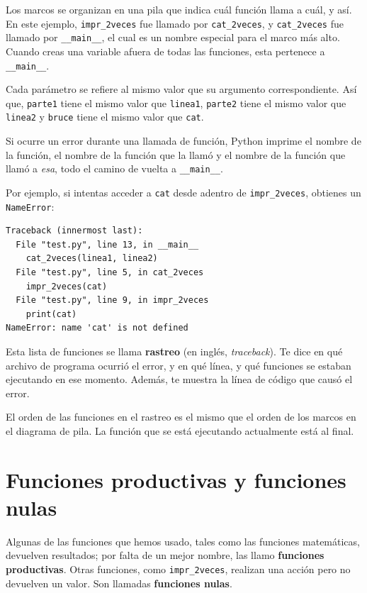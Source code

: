 \documentclass[10pt]{book}
\begin{document}
Los marcos se organizan en una pila que indica cuál función
llama a cuál, y así.  En este ejemplo, \verb"impr_2veces"
fue llamado por \verb"cat_2veces", y \verb"cat_2veces" fue llamado por
\verb"__main__", el cual es un nombre especial para el marco más alto.  Cuando
creas una variable afuera de todas las funciones, esta pertenece a
\verb"__main__".


Cada parámetro se refiere al mismo valor que su argumento
correspondiente.  Así que, {\tt parte1} tiene el mismo valor que
{\tt linea1}, {\tt parte2} tiene el mismo valor que {\tt linea2}
y {\tt bruce} tiene el mismo valor que {\tt cat}.

Si ocurre un error durante una llamada de función, Python imprime el
nombre de la función, el nombre de la función que la llamó
y el nombre de la función que llamó a {\em esa}, todo el
camino de vuelta a \verb"__main__".

Por ejemplo, si intentas acceder a {\tt cat} desde adentro de
\verb"impr_2veces", obtienes un {\tt NameError}:

\begin{verbatim}
Traceback (innermost last):
  File "test.py", line 13, in __main__
    cat_2veces(linea1, linea2)
  File "test.py", line 5, in cat_2veces
    impr_2veces(cat)
  File "test.py", line 9, in impr_2veces
    print(cat)
NameError: name 'cat' is not defined
\end{verbatim}
%
Esta lista de funciones se llama {\bf rastreo} (en inglés, {\em traceback}).  Te dice en qué
archivo de programa ocurrió el error, y en qué línea, y qué funciones
se estaban ejecutando en ese momento.  Además, te muestra la línea de código que
causó el error.

El orden de las funciones en el rastreo es el mismo que el
orden de los marcos en el diagrama de pila.  La función que se está
ejecutando actualmente está al final.


\section{Funciones productivas y funciones nulas}

Algunas de las funciones que hemos usado, tales como las funciones matemáticas, devuelven
resultados; por falta de un mejor nombre, las llamo {\bf funciones
  productivas}.  Otras funciones, como \verb"impr_2veces", realizan una
acción pero no devuelven un valor.  Son llamadas {\bf funciones
  nulas}.
\end{document}
